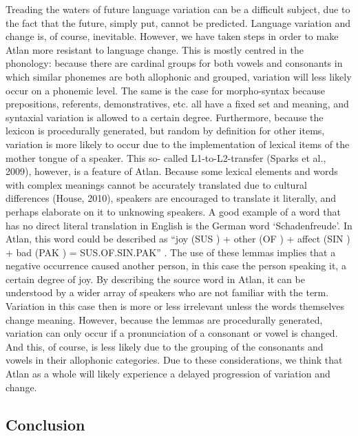 Treading the waters of future language variation can be a difficult subject, due to the fact that the future, simply put, cannot be predicted. Language variation and change is, of course, inevitable. However, we have taken steps in order to make Atlan more resistant to language change. This is mostly centred in the phonology: because there are cardinal groups for both vowels and consonants in which similar phonemes are both allophonic and grouped, variation will less likely occur on a phonemic level. The same is the case for morpho-syntax because prepositions, referents, demonstratives, etc. all have a fixed set and meaning, and syntaxial variation is allowed to a certain degree. Furthermore, because the lexicon is procedurally generated, but random by definition for other items, variation is more likely to occur due to the implementation of lexical items of the mother tongue of a speaker. This so- called L1-to-L2-transfer (Sparks et al., 2009), however, is a feature of Atlan. Because some lexical elements and words with complex meanings cannot be accurately translated due to cultural differences (House, 2010), speakers are encouraged to translate it literally, and perhaps elaborate on it to unknowing speakers. A good example of a word that has no direct literal translation in English is the German word ‘Schadenfreude’. In Atlan, this word could be described as “joy (SUS \sus) + other (OF \of) + affect (SIN \Atlansin) + bad (PAK \pak) = SUS.OF.SIN.PAK” \sus \of \Atlansin \pak. The use of these lemmas implies that a negative occurrence caused another person, in this case the person speaking it, a certain degree of joy. By describing the source word in Atlan, it can be understood by a wider array of speakers who are not familiar with the term. Variation in this case then is more or less irrelevant unless the words themselves change meaning. However, because the lemmas are procedurally generated, variation can only occur if a pronunciation of a consonant or vowel is changed. And this, of course, is less likely due to the grouping of the consonants and vowels in their allophonic categories. Due to these considerations, we think that Atlan as a whole will likely experience a delayed progression of variation and change.

\vspace{-0.3cm}
\subsection{Conclusion}

